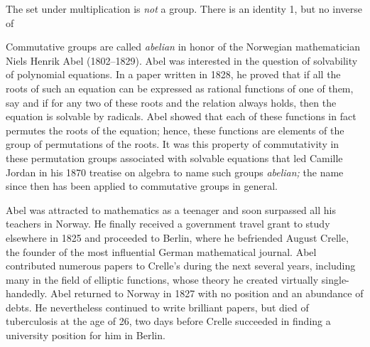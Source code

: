 \documentclass[11pt,oneside]{article}
\begin{document}
\begin{BookBody}
 The set  under multiplication is\textit{ not} a group. There is an identity 1, but no inverse of \BookEnd{\blacktriangle}


\noindent Commutative groups are called\textit{ abelian} in honor of the Norwegian mathematician Niels Henrik Abel (1802–1829). Abel was interested in the question of solvability of polynomial equations. In a paper written in 1828, he proved that if all the roots of such an equation can be expressed as rational functions  of one of them, say  and if for any two of these roots and  the relation  always holds, then the equation is solvable by radicals. Abel showed that each of these functions in fact permutes the roots of the equation; hence, these functions are elements of the group of permutations of the roots. It was this property of commutativity in these permutation groups associated with solvable equations that led Camille Jordan in his 1870 treatise on algebra to name such groups\textit{ abelian;} the name since then has been applied to commutative groups in general.

Abel was attracted to mathematics as a teenager and soon surpassed all his teachers in Norway. He finally received a government travel grant to study elsewhere in 1825 and proceeded to Berlin, where he befriended August Crelle, the founder of the most influential German mathematical journal. Abel contributed numerous papers to Crelle’s  during the next several years, including many in the field of elliptic functions, whose theory he created virtually single-handedly. Abel returned to Norway in 1827 with no position and an abundance of debts. He nevertheless continued to write brilliant papers, but died of tuberculosis at the age of 26, two days before Crelle succeeded in finding a university position for him in Berlin.

\end{BookBody}

\BookNarrativetrue
\end{document}
